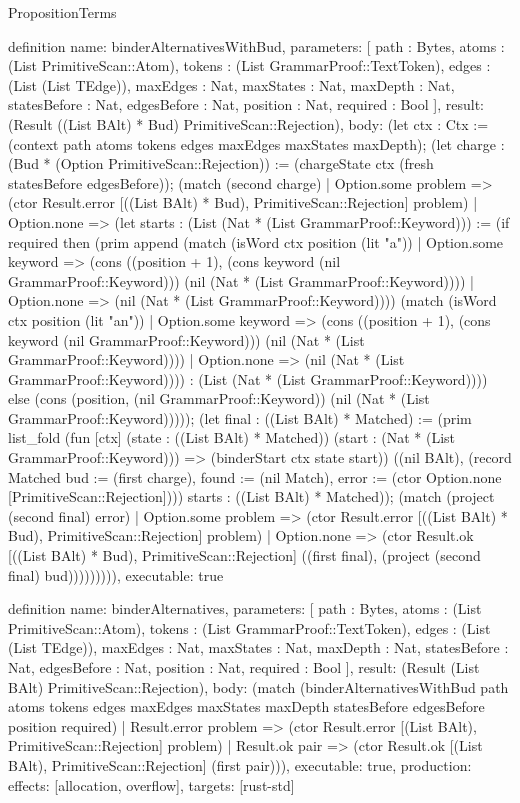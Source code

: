\begin{lexlean}{PropositionTerms}
\begin{semanticmodule}
definition{
  name: binderAlternativesWithBud,
  parameters: [
    path : Bytes,
    atoms : (List PrimitiveScan::Atom),
    tokens : (List GrammarProof::TextToken),
    edges : (List (List TEdge)),
    maxEdges : Nat,
    maxStates : Nat,
    maxDepth : Nat,
    statesBefore : Nat,
    edgesBefore : Nat,
    position : Nat,
    required : Bool
  ],
  result: (Result ((List BAlt) * Bud) PrimitiveScan::Rejection),
  body: (let ctx : Ctx := (context path atoms tokens edges maxEdges maxStates maxDepth); (let charge : (Bud * (Option PrimitiveScan::Rejection)) := (chargeState ctx (fresh statesBefore edgesBefore)); (match (second charge)
    | Option.some problem => (ctor Result.error [((List BAlt) * Bud), PrimitiveScan::Rejection] problem)
    | Option.none => (let starts : (List (Nat * (List GrammarProof::Keyword))) := (if required then (prim append (match (isWord ctx position (lit "a"))
      | Option.some keyword => (cons ((position + 1), (cons keyword (nil GrammarProof::Keyword))) (nil (Nat * (List GrammarProof::Keyword))))
      | Option.none => (nil (Nat * (List GrammarProof::Keyword)))) (match (isWord ctx position (lit "an"))
      | Option.some keyword => (cons ((position + 1), (cons keyword (nil GrammarProof::Keyword))) (nil (Nat * (List GrammarProof::Keyword))))
      | Option.none => (nil (Nat * (List GrammarProof::Keyword)))) : (List (Nat * (List GrammarProof::Keyword)))) else (cons (position, (nil GrammarProof::Keyword)) (nil (Nat * (List GrammarProof::Keyword))))); (let final : ((List BAlt) * Matched) := (prim list_fold (fun [ctx] (state : ((List BAlt) * Matched)) (start : (Nat * (List GrammarProof::Keyword))) => (binderStart ctx state start)) ((nil BAlt), (record Matched {bud := (first charge), found := (nil Match), error := (ctor Option.none [PrimitiveScan::Rejection])})) starts : ((List BAlt) * Matched)); (match (project (second final) error)
      | Option.some problem => (ctor Result.error [((List BAlt) * Bud), PrimitiveScan::Rejection] problem)
      | Option.none => (ctor Result.ok [((List BAlt) * Bud), PrimitiveScan::Rejection] ((first final), (project (second final) bud))))))))),
  executable: true
}

definition{
  name: binderAlternatives,
  parameters: [
    path : Bytes,
    atoms : (List PrimitiveScan::Atom),
    tokens : (List GrammarProof::TextToken),
    edges : (List (List TEdge)),
    maxEdges : Nat,
    maxStates : Nat,
    maxDepth : Nat,
    statesBefore : Nat,
    edgesBefore : Nat,
    position : Nat,
    required : Bool
  ],
  result: (Result (List BAlt) PrimitiveScan::Rejection),
  body: (match (binderAlternativesWithBud path atoms tokens edges maxEdges maxStates maxDepth statesBefore edgesBefore position required)
    | Result.error problem => (ctor Result.error [(List BAlt), PrimitiveScan::Rejection] problem)
    | Result.ok pair => (ctor Result.ok [(List BAlt), PrimitiveScan::Rejection] (first pair))),
  executable: true,
  production: {effects: [allocation, overflow], targets: [rust-std]}
}


\end{semanticmodule}
\end{lexlean}
